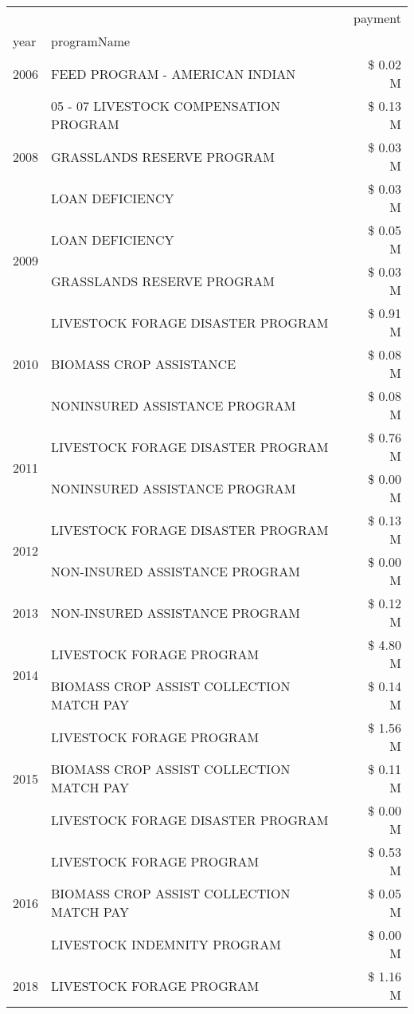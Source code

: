 \begin{tabular}{llr}
\toprule
 &  & payment \\
year & programName &  \\
\midrule
2006 & FEED PROGRAM - AMERICAN INDIAN & \$ 0.02 M \\
\cline{1-3}
\multirow[t]{3}{*}{2008} & 05 - 07 LIVESTOCK COMPENSATION PROGRAM & \$ 0.13 M \\
 & GRASSLANDS RESERVE PROGRAM & \$ 0.03 M \\
 & LOAN DEFICIENCY & \$ 0.03 M \\
\cline{1-3}
\multirow[t]{2}{*}{2009} & LOAN DEFICIENCY & \$ 0.05 M \\
 & GRASSLANDS RESERVE PROGRAM & \$ 0.03 M \\
\cline{1-3}
\multirow[t]{3}{*}{2010} & LIVESTOCK FORAGE DISASTER  PROGRAM & \$ 0.91 M \\
 & BIOMASS CROP ASSISTANCE & \$ 0.08 M \\
 & NONINSURED ASSISTANCE PROGRAM & \$ 0.08 M \\
\cline{1-3}
\multirow[t]{2}{*}{2011} & LIVESTOCK FORAGE DISASTER PROGRAM & \$ 0.76 M \\
 & NONINSURED ASSISTANCE PROGRAM & \$ 0.00 M \\
\cline{1-3}
\multirow[t]{2}{*}{2012} & LIVESTOCK FORAGE DISASTER PROGRAM & \$ 0.13 M \\
 & NON-INSURED ASSISTANCE PROGRAM & \$ 0.00 M \\
\cline{1-3}
2013 & NON-INSURED ASSISTANCE PROGRAM & \$ 0.12 M \\
\cline{1-3}
\multirow[t]{2}{*}{2014} & LIVESTOCK FORAGE PROGRAM & \$ 4.80 M \\
 & BIOMASS CROP ASSIST COLLECTION MATCH PAY & \$ 0.14 M \\
\cline{1-3}
\multirow[t]{3}{*}{2015} & LIVESTOCK FORAGE PROGRAM & \$ 1.56 M \\
 & BIOMASS CROP ASSIST COLLECTION MATCH PAY & \$ 0.11 M \\
 & LIVESTOCK FORAGE DISASTER PROGRAM & \$ 0.00 M \\
\cline{1-3}
\multirow[t]{3}{*}{2016} & LIVESTOCK FORAGE PROGRAM                      & \$ 0.53 M \\
 & BIOMASS CROP ASSIST COLLECTION MATCH PAY      & \$ 0.05 M \\
 & LIVESTOCK INDEMNITY PROGRAM                   & \$ 0.00 M \\
\cline{1-3}
2018 & LIVESTOCK FORAGE PROGRAM & \$ 1.16 M \\
\cline{1-3}

\end{tabular}
